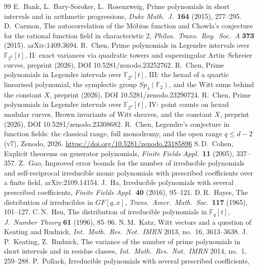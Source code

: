 \documentclass[11pt,a4paper]{article}
\theoremstyle{definition}
\theoremstyle{remark}
\begin{document}
\begin{thebibliography}{99}
 E.~Bank, L.~Bary-Soroker, L.~Rosenzweig, Prime polynomials in short intervals and in
 arithmetic progressions, \textit{Duke Math.\ J.}\ \textbf{164} (2015), 277--295.
 D.~Carmon, The autocorrelation of the M\"obius function and Chowla's conjecture
 for the rational function field in characteristic 2, \textit{Philos.\ Trans.\ Roy.\ Soc.\ A} \textbf{373} (2015). arXiv:1409.3694.
 R.~Chen, Prime polynomials in Legendre intervals over $\mathbb F_{2^k}[t]$, II:
 exact variances via quadratic towers and supersingular Artin--Schreier curves, preprint (2026),
 DOI 10.5281/zenodo.23252762.
 R.~Chen, Prime polynomials in Legendre intervals over $\mathbb F_{2^k}[t]$, III:
 the hexad of a quartic linearised polynomial, the symplectic group $Sp_4(\mathbb F_2)$, and the Witt sums
 behind the constant $X$, preprint (2026), DOI 10.5281/zenodo.23290724.
 R.~Chen, Prime polynomials in Legendre intervals over $\mathbb F_{2^k}[t]$, IV:
 point counts on hexad modular curves, Brown invariants of Witt sheaves, and the constant $X$,
 preprint (2026), DOI 10.5281/zenodo.23308682.
 R.~Chen, Legendre's conjecture in function fields: the classical range, full monodromy,
 and the open range $q\le d-2$ (v7), Zenodo, 2026. \url{https://doi.org/10.5281/zenodo.23185896}
 S.\,D.~Cohen, Explicit theorems on generator polynomials,
 \textit{Finite Fields Appl.}\ \textbf{11} (2005), 337--357.
 Z.~Gao, Improved error bounds for the number of irreducible polynomials and
 self-reciprocal irreducible monic polynomials with prescribed coefficients over a finite field, arXiv:2109.14154.
 J.~Ha, Irreducible polynomials with several prescribed coefficients,
 \textit{Finite Fields Appl.}\ \textbf{40} (2016), 95--121.
 D.\,R.~Hayes, The distribution of irreducibles in $GF[q,x]$,
 \textit{Trans.\ Amer.\ Math.\ Soc.}\ \textbf{117} (1965), 101--127.
 C.\,N.~Hsu, The distribution of irreducible polynomials in $\mathbb F_q[t]$,
 \textit{J.\ Number Theory} \textbf{61} (1996), 85--96.
 N.\,M.~Katz, Witt vectors and a question of Keating and Rudnick,
 \textit{Int.\ Math.\ Res.\ Not.\ IMRN} 2013, no.~16, 3613--3638.
 J.\,P.~Keating, Z.~Rudnick, The variance of the number of prime polynomials in short
 intervals and in residue classes, \textit{Int.\ Math.\ Res.\ Not.\ IMRN} 2014, no.~1, 259--288.
 P.~Pollack, Irreducible polynomials with several prescribed coefficients,

\end{thebibliography}
\end{document}
